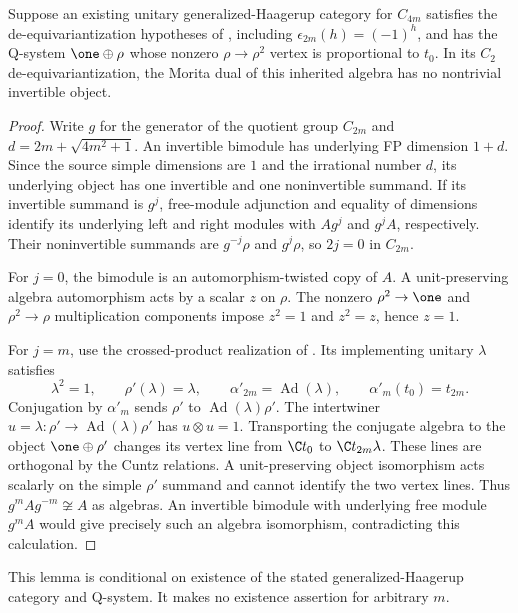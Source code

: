 \begin{lemma}
\label{lem:cyclic-gh-invertibles-next}
Suppose an existing unitary generalized-Haagerup category for $C_{4m}$
satisfies the de-equivariantization hypotheses of
\cite[Section~6]{GrossmanIzumiCentersNext}, including
$\epsilon_{2m}(h)=(-1)^h$, and has the Q-system $\one\oplus\rho$
whose nonzero $\rho\to\rho^2$ vertex is proportional to $t_0$.
In its $C_2$ de-equivariantization, the Morita dual of this inherited algebra
has no nontrivial invertible object.
\end{lemma}
\begin{proof}
Write $g$ for the generator of the quotient group $C_{2m}$ and
$d=2m+\sqrt{4m^2+1}$. An invertible bimodule has underlying FP dimension
$1+d$. Since the source simple dimensions are $1$ and the irrational number
$d$, its underlying object has one invertible and one noninvertible
summand. If its invertible summand is $g^j$, free-module adjunction and
 equality of dimensions identify its underlying left and right modules with
$A g^j$ and $g^j A$, respectively. Their noninvertible summands are
$g^{-j}\rho$ and $g^j\rho$, so $2j=0$ in $C_{2m}$.

For $j=0$, the bimodule is an automorphism-twisted copy of $A$.
A unit-preserving algebra automorphism acts by a scalar $z$ on $\rho$.
The nonzero $\rho^2\to\one$ and $\rho^2\to\rho$ multiplication components
impose $z^2=1$ and $z^2=z$, hence $z=1$.

For $j=m$, use the crossed-product realization of
\cite[Section~6]{GrossmanIzumiCentersNext}. Its implementing unitary
$\lambda$ satisfies
\[
 \lambda^2=1,\qquad \rho'(\lambda)=\lambda,\qquad
 \alpha'_{2m}=\operatorname{Ad}(\lambda),\qquad
 \alpha'_m(t_0)=t_{2m}.
\]
Conjugation by $\alpha'_m$ sends $\rho'$ to
$\operatorname{Ad}(\lambda)\rho'$. The intertwiner
$u=\lambda:\rho'\to\operatorname{Ad}(\lambda)\rho'$ has
$u\otimes u=1$. Transporting the conjugate algebra to the object
$\one\oplus\rho'$ changes its vertex line from $\C t_0$ to
$\C t_{2m}\lambda$. These lines are orthogonal by the Cuntz relations.
A unit-preserving object isomorphism acts scalarly on the simple
$\rho'$ summand and cannot identify the two vertex lines. Thus
$g^m A g^{-m}\not\cong A$ as algebras. An invertible bimodule with underlying
free module $g^m A$ would give precisely such an algebra isomorphism,
contradicting this calculation.
\end{proof}
This lemma is conditional on existence of the stated generalized-Haagerup
category and Q-system. It makes no existence assertion for arbitrary $m$.

